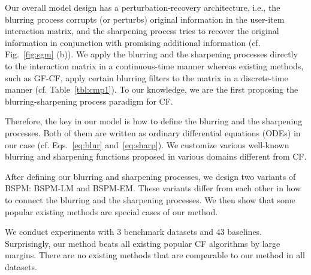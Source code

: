 \documentclass[sigconf,natbib=true]{acmart}
\begin{document}
Our overall model design has a perturbation-recovery architecture, i.e., the blurring process corrupts (or perturbs) original information in the user-item interaction matrix, and the sharpening process tries to recover the original information in conjunction with promising additional information (cf. Fig.~\ref{fig:sgm} (b)). We apply the blurring and the sharpening processes directly to the interaction matrix in a continuous-time manner whereas existing methods, such as GF-CF, apply certain blurring filters to the matrix in a discrete-time manner (cf. Table~\ref{tbl:cmp1}). To our knowledge, we are the first proposing the blurring-sharpening process paradigm for CF.

Therefore, the key in our model is how to define the blurring and the sharpening processes. Both of them are written as ordinary differential equations (ODEs) in our case (cf. Eqs.~\eqref{eq:blur} and~\eqref{eq:sharp}). We customize various well-known blurring and sharpening functions proposed in various domains different from CF.

After defining our blurring and sharpening processes, we design two variants of BSPM: BSPM-LM and BSPM-EM. These variants differ from each other in how to connect the blurring and the sharpening processes. We then show that some popular existing methods are special cases of our method.

We conduct experiments with 3 benchmark datasets and 43 baselines. Surprisingly, our method beats all existing popular CF algorithms by large margins. There are no existing methods that are comparable to our method in all datasets.
\end{document}
